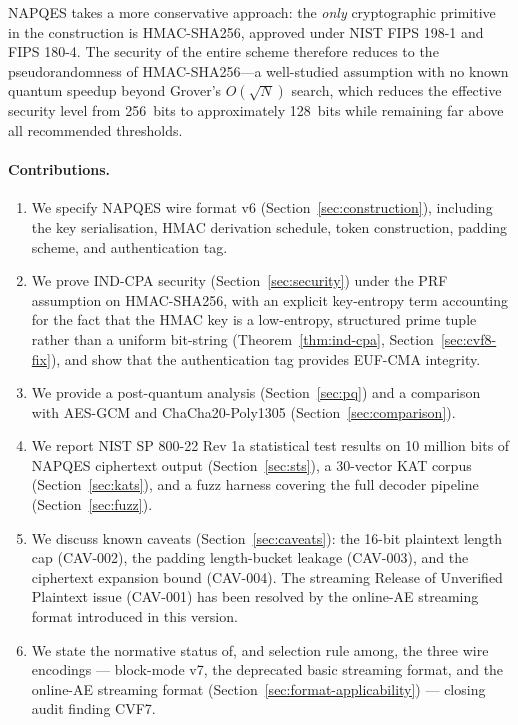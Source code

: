 \documentclass[11pt,a4paper]{article}
\begin{document}
NAPQES takes a more conservative approach: the \emph{only} cryptographic
primitive in the construction is HMAC-SHA256, approved under NIST FIPS 198-1
and FIPS 180-4.  The security of the entire scheme therefore reduces to the
pseudorandomness of HMAC-SHA256—a well-studied assumption with no known
quantum speedup beyond Grover's $O(\sqrt{N})$ search, which reduces the
effective security level from 256~bits to approximately 128~bits while
remaining far above all recommended thresholds.

\paragraph{Contributions.}
\begin{enumerate}
  \item We specify NAPQES wire format v6 (Section~\ref{sec:construction}),
        including the key serialisation, HMAC derivation schedule,
        token construction, padding scheme, and authentication tag.
  \item We prove IND-CPA security (Section~\ref{sec:security}) under the
        PRF assumption on HMAC-SHA256, with an explicit key-entropy term
        accounting for the fact that the HMAC key is a low-entropy,
        structured prime tuple rather than a uniform bit-string
        (Theorem~\ref{thm:ind-cpa}, Section~\ref{sec:cvf8-fix}), and show
        that the authentication tag provides EUF-CMA integrity.
  \item We provide a post-quantum analysis (Section~\ref{sec:pq}) and a
        comparison with AES-GCM and ChaCha20-Poly1305
        (Section~\ref{sec:comparison}).
  \item We report NIST SP 800-22 Rev 1a statistical test results on 10 million
        bits of NAPQES ciphertext output (Section~\ref{sec:sts}), a
        30-vector KAT corpus (Section~\ref{sec:kats}), and a fuzz harness
        covering the full decoder pipeline (Section~\ref{sec:fuzz}).
  \item We discuss known caveats (Section~\ref{sec:caveats}): the 16-bit
        plaintext length cap (CAV-002), the padding length-bucket leakage
        (CAV-003), and the ciphertext expansion bound (CAV-004).  The
        streaming Release of Unverified Plaintext issue (CAV-001) has been
        resolved by the online-AE streaming format introduced in this version.
  \item We state the normative status of, and selection rule among, the
        three wire encodings — block-mode v7, the deprecated basic
        streaming format, and the online-AE streaming format
        (Section~\ref{sec:format-applicability}) — closing audit finding
        CVF7.
\end{enumerate}
\end{document}
